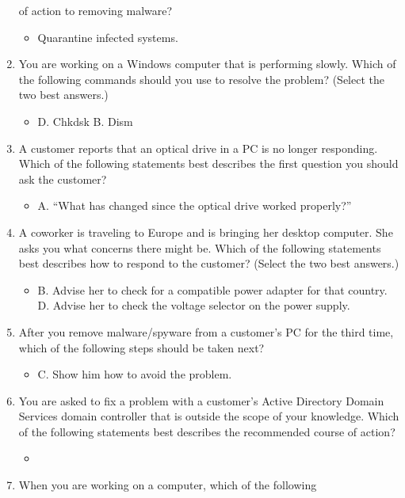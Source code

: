 \documentclass{article}
\begin{document}
\begin{enumerate}
of action to removing malware?
    \begin{itemize}
        \item Quarantine infected systems.
    \end{itemize}
    \item You are working on a Windows computer that is performing
slowly. Which of the following commands should you use to
resolve the problem? (Select the two best answers.)
    \begin{itemize}
        \item D. Chkdsk B. Dism
    \end{itemize}
    \item A customer reports that an optical drive in a PC is no longer
responding. Which of the following statements best describes the
first question you should ask the customer?
    \begin{itemize}
        \item A. “What has changed since the optical drive worked
properly?”
    \end{itemize}
    \item A coworker is traveling to Europe and is bringing her desktop
computer. She asks you what concerns there might be. Which of
the following statements best describes how to respond to the
customer? (Select the two best answers.)
    \begin{itemize}
        \item B. Advise her to check for a compatible power adapter for
that country. D. Advise her to check the voltage selector on the power
supply.
    \end{itemize}
    \item After you remove malware/spyware from a customer’s PC for the
third time, which of the following steps should be taken next?
    \begin{itemize}
        \item C. Show him how to avoid the problem.
    \end{itemize}
    \item You are asked to fix a problem with a customer’s Active Directory
Domain Services domain controller that is outside the scope of
your knowledge. Which of the following statements best describes
the recommended course of action?
    \begin{itemize}
        \item 
    \end{itemize}
    \item When you are working on a computer, which of the following

\end{enumerate}
\end{document}
